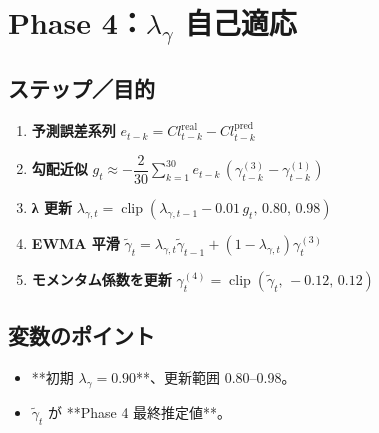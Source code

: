 
\section*{Phase 4：$\lambda_{\gamma}$ 自己適応}\nopagebreak[4]
\subsection*{ステップ／目的}
\begin{flushleft}
\begin{enumerate}
  \item \textbf{予測誤差系列}\;
        \(e_{t-k}=Cl_{t-k}^{\text{real}}-Cl_{t-k}^{\text{pred}}\)
  \item \textbf{勾配近似}\;
        \(g_t\approx-\dfrac{2}{30}\sum_{k=1}^{30}
          e_{t-k}\,(\gamma_{t-k}^{(3)}-\gamma_{t-k}^{(1)})\)
  \item \textbf{λ 更新}\;
        \(
          \lambda_{\gamma,t}
            =\operatorname{clip}(
              \lambda_{\gamma,t-1}-0.01\,g_t,\,0.80,\,0.98)
        \)
  \item \textbf{EWMA 平滑}\;
        \(\tilde\gamma_t=
          \lambda_{\gamma,t}\tilde\gamma_{t-1}
          +(1-\lambda_{\gamma,t})\gamma_t^{(3)}\)
  \item \textbf{モメンタム係数を更新}\;
        \(
          \gamma_t^{(4)}=\operatorname{clip}(\tilde\gamma_t,\,-0.12,\,0.12)
        \)
\end{enumerate}
\end{flushleft}

\subsection*{変数のポイント}
\begin{flushleft}
\begin{itemize}
  \item **初期 \(\lambda_{\gamma}=0.90\)**、更新範囲 0.80–0.98。  
  \item \(\tilde\gamma_t\) が **Phase 4 最終推定値**。
\end{itemize}
\end{flushleft}

